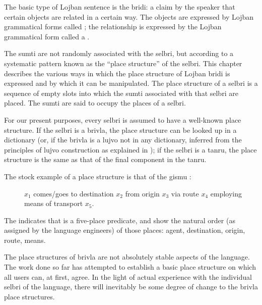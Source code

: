 The basic type of Lojban sentence is the bridi: a claim by
    the speaker that certain objects are related in a certain way.
    The objects are expressed by Lojban grammatical forms called
    ; the relationship is expressed by the Lojban
    grammatical form called a .

The sumti are not randomly associated with the selbri, but
    according to a systematic pattern known as the ``place
    structure'' of the selbri. This chapter describes the various
    ways in which the place structure of Lojban bridi is expressed
    and by which it can be manipulated. The place structure of a
    selbri is a sequence of empty slots into which the sumti
    associated with that selbri are placed. The sumti are said to
    occupy the places of a selbri.

For our present purposes, every selbri is assumed to have a
    well-known place structure. If the selbri is a brivla, the
    place structure can be looked up in a dictionary (or, if the
    brivla is a lujvo not in any dictionary, inferred from the
    principles of lujvo construction as explained in ); if the selbri is a tanru,
    the place structure is the same as that of the final component
    in the tanru.

The stock example of a place structure is that of the gismu
    :
\begin{description}
\item[] $x_1$ comes/goes to destination $x_2$ from origin $x_3$ via route $x_4$ employing means of transport $x_5$.

\end{description}

The  indicates that  is a five-place
    predicate, and show the natural order (as assigned by the
    language engineers) of those places: agent, destination,
    origin, route, means.

The place structures of brivla are not absolutely stable
    aspects of the language. The work done so far has attempted to
    establish a basic place structure on which all users can, at
    first, agree. In the light of actual experience with the
    individual selbri of the language, there will inevitably be
    some degree of change to the brivla place structures.





